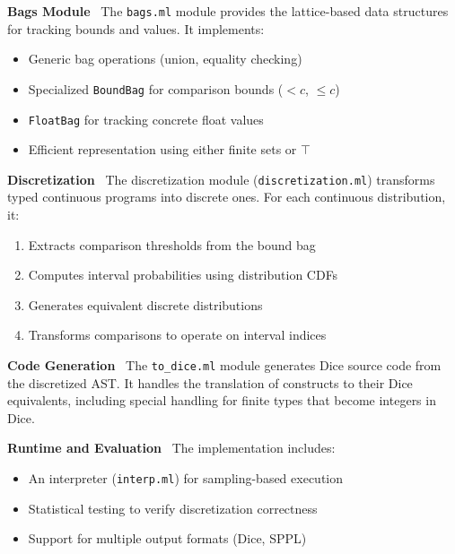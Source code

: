 \documentclass[acmsmall,screen,dvipsnames,x11names,nonacm,anonymous,review]{acmart}
\renewcommand{\paragraph}[1]{\vspace{1em}\noindent\textbf{#1}\ }
\begin{document}
\paragraph{Bags Module} The \texttt{bags.ml} module provides the lattice-based data structures for tracking bounds and values. It implements:
\begin{itemize}
    \item Generic bag operations (union, equality checking)
    \item Specialized \texttt{BoundBag} for comparison bounds ($<c$, $\leq c$)
    \item \texttt{FloatBag} for tracking concrete float values
    \item Efficient representation using either finite sets or $\top$
\end{itemize}

\paragraph{Discretization} The discretization module (\texttt{discretization.ml}) transforms typed continuous programs into discrete ones. For each continuous distribution, it:
\begin{enumerate}
    \item Extracts comparison thresholds from the bound bag
    \item Computes interval probabilities using distribution CDFs
    \item Generates equivalent discrete distributions
    \item Transforms comparisons to operate on interval indices
\end{enumerate}

\paragraph{Code Generation} The \texttt{to\_dice.ml} module generates Dice source code from the discretized AST. It handles the translation of \Slice{} constructs to their Dice equivalents, including special handling for finite types that become integers in Dice.

\paragraph{Runtime and Evaluation} The implementation includes:
\begin{itemize}
    \item An interpreter (\texttt{interp.ml}) for sampling-based execution
    \item Statistical testing to verify discretization correctness
    \item Support for multiple output formats (Dice, SPPL)
\end{itemize}
\end{document}
